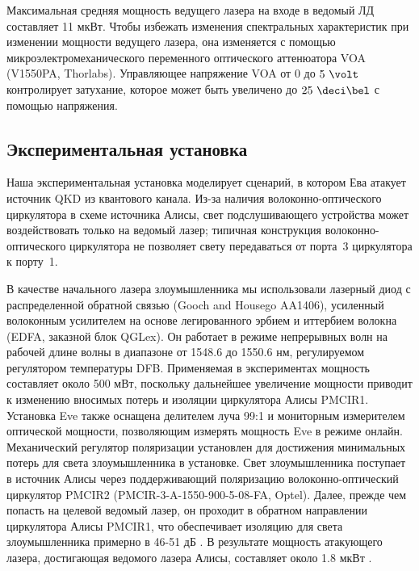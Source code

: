 Максимальная средняя мощность ведущего лазера на входе в ведомый ЛД составляет 11 мкВт. Чтобы избежать изменения спектральных характеристик при изменении мощности ведущего лазера, она изменяется с помощью микроэлектромеханического переменного оптического аттенюатора VOA (V1550PA, Thorlabs). Управляющее напряжение VOA от 0 до $5~\volt$ контролирует затухание, которое может быть увеличено до $25~\deci\bel$ с помощью напряжения. 

\subsection{Экспериментальная установка}

Наша экспериментальная установка моделирует сценарий, в котором Ева атакует источник QKD из квантового канала. Из-за наличия волоконно-оптического циркулятора в схеме источника Алисы, свет подслушивающего устройства может воздействовать только на ведомый лазер; типичная конструкция волоконно-оптического циркулятора не позволяет свету передаваться от порта~3 циркулятора к порту~1.

В качестве начального лазера злоумышленника мы использовали лазерный диод с распределенной обратной связью (Gooch and Housego AA1406), усиленный волоконным усилителем на основе легированного эрбием и иттербием волокна (EDFA, заказной блок QGLex)\cite{huang2020}. Он работает в режиме непрерывных волн на рабочей длине волны в диапазоне от 1548.6  до 1550.6 нм, регулируемом регулятором температуры DFB. Применяемая в экспериментах мощность составляет около 500 мВт, поскольку дальнейшее увеличение мощности приводит к изменению вносимых потерь и изоляции циркулятора Алисы PMCIR1. Установка Eve также оснащена делителем луча 99:1 и мониторным измерителем оптической мощности, позволяющим измерять мощность Eve в режиме онлайн. Механический регулятор поляризации установлен для достижения минимальных потерь для света злоумышленника в установке. Свет злоумышленника поступает в источник Алисы через поддерживающий поляризацию волоконно-оптический циркулятор PMCIR2 (PMCIR-3-A-1550-900-5-08-FA, Optel). Далее, прежде чем попасть на целевой ведомый лазер, он проходит в обратном направлении циркулятора Алисы PMCIR1, что обеспечивает изоляцию для света злоумышленника примерно в 46-51 дБ . В результате мощность атакующего лазера, достигающая ведомого лазера Алисы, составляет около 1.8 мкВт .

